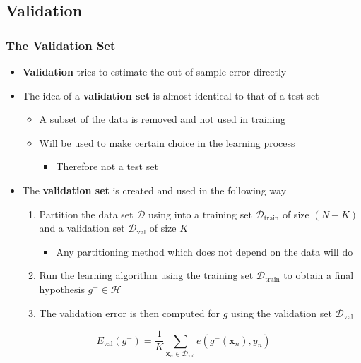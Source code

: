 \documentclass[11pt]{article}
\begin{document}
\subsection{Validation}
\label{sec:orgaf2f4f1}
\subsubsection{The Validation Set}
\label{sec:org8bb81ff}
\begin{itemize}
\item \textbf{Validation} tries to estimate the out-of-sample error directly

\item The idea of a \textbf{validation set} is almost identical to that of a test set
\begin{itemize}
\item A subset of the data is removed and not used in training
\item Will be used to make certain choice in the learning process
\begin{itemize}
\item Therefore not a test set
\end{itemize}
\end{itemize}

\item The \textbf{validation set} is created and used in the following way
\begin{enumerate}
\item Partition the data set \(\mathcal D\) using into a training set \(\mathcal D_\text{train}\) of size \((N-K)\) and a validation set \(\mathcal D_\text{val}\) of size \(K\)
\begin{itemize}
\item Any partitioning method which does not depend on the data will do
\end{itemize}
\item Run the learning algorithm using the training set \(\mathcal D_\text{train}\) to obtain a final hypothesis \(g^- \in \mathcal H\)
\item The validation error is then computed for \(g\) using the validation set \(\mathcal D_\text{val}\)
\end{enumerate}
\end{itemize}
\begin{equation}
  E_\text{val}(g^-)=\frac1K\sum_{\pmb x_n \in \mathcal D_\text{val}} e(g^-(\pmb x_n),y_n)
\end{equation}
\end{document}
